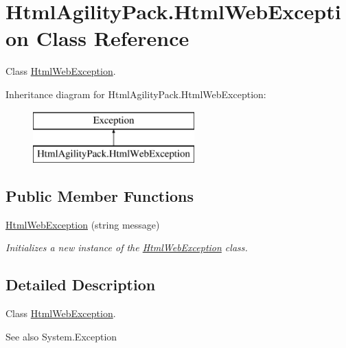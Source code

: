 \hypertarget{class_html_agility_pack_1_1_html_web_exception}{}\section{Html\+Agility\+Pack.\+Html\+Web\+Exception Class Reference}
\label{class_html_agility_pack_1_1_html_web_exception}


Class \hyperlink{class_html_agility_pack_1_1_html_web_exception}{Html\+Web\+Exception}.  


Inheritance diagram for Html\+Agility\+Pack.\+Html\+Web\+Exception\+:\begin{figure}[H]
\begin{center}
\leavevmode
\includegraphics[height=2.000000cm]{class_html_agility_pack_1_1_html_web_exception}
\end{center}
\end{figure}
\subsection*{Public Member Functions}
\begin{DoxyCompactItemize}
\item 
\hyperlink{class_html_agility_pack_1_1_html_web_exception_ae1108e56f38e67425517e8c54dd24029}{Html\+Web\+Exception} (string message)
\begin{DoxyCompactList}\small\item\em Initializes a new instance of the \hyperlink{class_html_agility_pack_1_1_html_web_exception}{Html\+Web\+Exception} class. \end{DoxyCompactList}\end{DoxyCompactItemize}


\subsection{Detailed Description}
Class \hyperlink{class_html_agility_pack_1_1_html_web_exception}{Html\+Web\+Exception}. 

\begin{DoxySeeAlso}{See also}
System.\+Exception


\end{DoxySeeAlso}


